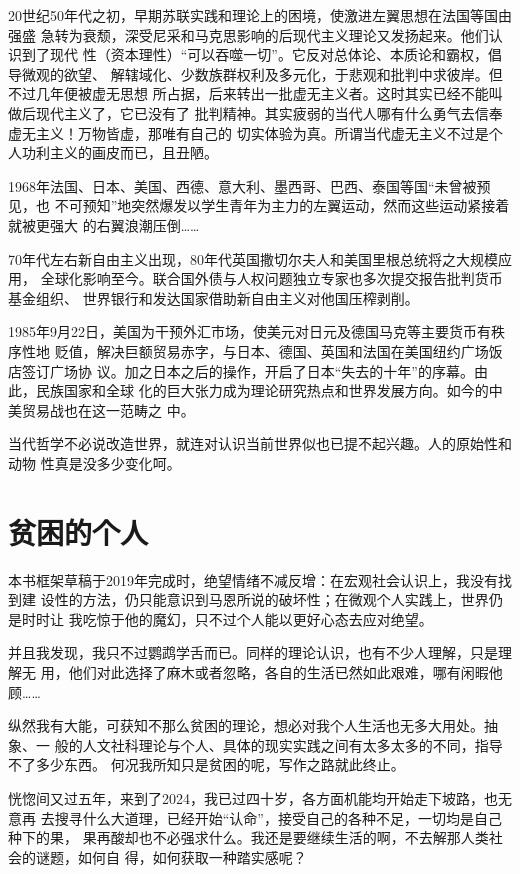 20世纪50年代之初，早期苏联实践和理论上的困境，使激进左翼思想在法国等国由强盛
急转为衰颓，深受尼采和马克思影响的后现代主义理论又发扬起来。他们认识到了现代
性（资本理性）“可以吞噬一切”。它反对总体论、本质论和霸权，倡导微观的欲望、
解辖域化、少数族群权利及多元化，于悲观和批判中求彼岸。但不过几年便被虚无思想
所占据，后来转出一批虚无主义者。这时其实已经不能叫做后现代主义了，它已没有了
批判精神。其实疲弱的当代人哪有什么勇气去信奉虚无主义！万物皆虚，那唯有自己的
切实体验为真。所谓当代虚无主义不过是个人功利主义的画皮而已，且丑陋。

1968年法国、日本、美国、西德、意大利、墨西哥、巴西、泰国等国“未曾被预见，也
不可预知”地突然爆发以学生青年为主力的左翼运动，然而这些运动紧接着就被更强大
的右翼浪潮压倒……

70年代左右新自由主义出现，80年代英国撒切尔夫人和美国里根总统将之大规模应用，
全球化影响至今。联合国外债与人权问题独立专家也多次提交报告批判货币基金组织、
世界银行和发达国家借助新自由主义对他国压榨剥削。

1985年9月22日，美国为干预外汇市场，使美元对日元及德国马克等主要货币有秩序性地
贬值，解决巨额贸易赤字，与日本、德国、英国和法国在美国纽约广场饭店签订广场协
议。加之日本之后的操作，开启了日本“失去的十年”的序幕。由此，民族国家和全球
化的巨大张力成为理论研究热点和世界发展方向。如今的中美贸易战也在这一范畴之
中。

当代哲学不必说改造世界，就连对认识当前世界似也已提不起兴趣。人的原始性和动物
性真是没多少变化呵。

\section*{贫困的个人}

本书框架草稿于2019年完成时，绝望情绪不减反增：在宏观社会认识上，我没有找到建
设性的方法，仍只能意识到马恩所说的破坏性；在微观个人实践上，世界仍是时时让
我吃惊于他的魔幻，只不过个人能以更好心态去应对绝望。

并且我发现，我只不过鹦鹉学舌而已。同样的理论认识，也有不少人理解，只是理解无
用，他们对此选择了麻木或者忽略，各自的生活已然如此艰难，哪有闲暇他顾……

纵然我有大能，可获知不那么贫困的理论，想必对我个人生活也无多大用处。抽象、一
般的人文社科理论与个人、具体的现实实践之间有太多太多的不同，指导不了多少东西。
何况我所知只是贫困的呢，写作之路就此终止。


恍惚间又过五年，来到了2024，我已过四十岁，各方面机能均开始走下坡路，也无意再
去搜寻什么大道理，已经开始“认命”，接受自己的各种不足，一切均是自己种下的果，
果再酸却也不必强求什么。我还是要继续生活的啊，不去解那人类社会的谜题，如何自
得，如何获取一种踏实感呢？

